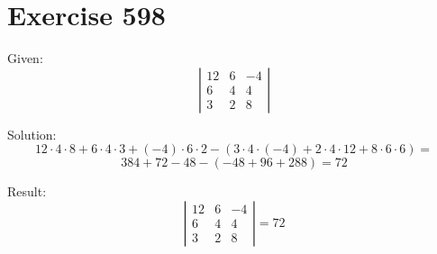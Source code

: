 \documentclass[a4paper, 10pt]{scrartcl}
\begin{document}
\section{Exercise 598}

Given:
\[
\left|
    \begin{array}{ccc}
    12 & 6 & -4\\
    6 & 4 & 4\\
    3 & 2 & 8
    \end{array}
\right|
\]

Solution:
\[
12\cdot4\cdot8 + 6\cdot4\cdot3 + (-4)\cdot6\cdot2 -
(3\cdot4\cdot(-4) + 2\cdot4\cdot12 + 8\cdot6\cdot6) =
\]
\[
384 + 72 - 48 - (-48 + 96 + 288) = 72
\]

Result:
\[
\left|
    \begin{array}{ccc}
    12 & 6 & -4\\
    6 & 4 & 4\\
    3 & 2 & 8
    \end{array}
\right| = 72
\]
\end{document}
